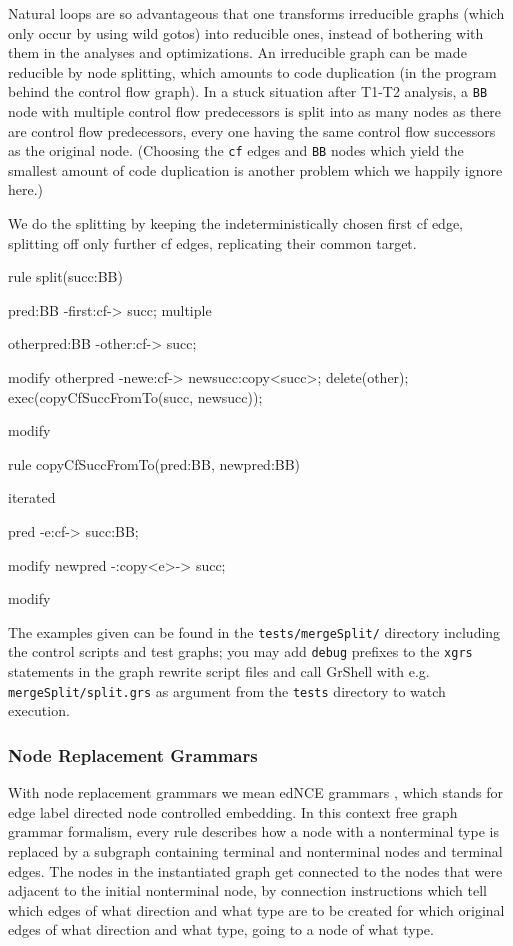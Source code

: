 Natural loops are so advantageous that one transforms irreducible graphs (which only occur by using wild gotos) into reducible ones, instead of bothering with them in the analyses and optimizations.
An irreducible graph can be made reducible by node splitting, which amounts to code duplication (in the program behind the control flow graph).
In a stuck situation after T1-T2 analysis, a \texttt{BB} node with multiple control flow predecessors is split into as many nodes as there are control flow predecessors, every one having the same control flow successors as the original node.
(Choosing the \texttt{cf} edges and \texttt{BB} nodes which yield the smallest amount of code duplication is another problem which we happily ignore here.)

  \begin{example}
We do the splitting by keeping the indeterministically chosen first cf edge, splitting off only further cf edges, replicating their common target.

    \begin{grgen}
rule split(succ:BB)
{
  pred:BB -first:cf-> succ;
  multiple {
    otherpred:BB -other:cf-> succ;
    
    modify {
      otherpred -newe:cf-> newsucc:copy<succ>;
      delete(other);
      exec(copyCfSuccFromTo(succ, newsucc));
    }
  }
  
  modify {
  }
}

rule copyCfSuccFromTo(pred:BB, newpred:BB)
{
  iterated {
    pred -e:cf-> succ:BB;
    
    modify {
      newpred -:copy<e>-> succ;
    }
  }
  
  modify {
  }
}
    \end{grgen}
  \end{example}

The examples given can be found in the \texttt{tests/mergeSplit/} directory including the control scripts and test graphs; you may add \texttt{debug} prefixes to the \texttt{xgrs} statements in the graph rewrite script files and call GrShell with e.g. \texttt{mergeSplit/split.grs} as argument from the \texttt{tests} directory to watch execution.

\subsubsection*{Node Replacement Grammars}
With node replacement grammars we mean edNCE grammars \cite{NodeReplacement}, which stands for edge label directed node controlled embedding. In this context free graph grammar formalism, every rule describes how a node with a nonterminal type is replaced by a subgraph containing terminal and nonterminal nodes and terminal edges. The nodes in the instantiated graph get connected to the nodes that were adjacent to the initial nonterminal node, by connection instructions which tell which edges of what direction and what type are to be created for which original edges of what direction and what type, going to a node of what type. 

